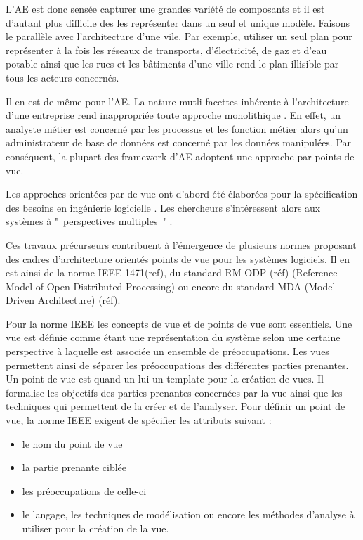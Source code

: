 L'AE est donc sensée capturer une grandes variété de composants et il est 
d'autant plus difficile des les représenter dans un seul et unique modèle. 
Faisons le parallèle avec l'architecture d'une vile. Par exemple, utiliser un 
seul plan pour représenter à la fois les réseaux de transports, d'électricité, 
de gaz et d'eau potable ainsi que les rues et les bâtiments d'une ville rend le 
plan illisible par tous les acteurs concernés.

Il en est de même pour l'AE. La nature mutli-facettes inhérente à l'architecture 
d'une entreprise rend inappropriée toute approche monolithique 
\cite{armour1999bigpicture}. En effet, un analyste métier est concerné par les 
processus et les fonction métier alors qu'un administrateur de base de données 
est concerné par les données manipulées. Par conséquent, la plupart des 
framework d'AE adoptent une approche par points de vue.

Les approches orientées par de vue ont d'abord été élaborées pour la 
spécification des besoins en ingénierie logicielle \cite{mullery1979core}. Les 
chercheurs s'intéressent alors aux systèmes à "~perspectives multiples~" 
\cite{finkelstein1992viewpoints} \cite{kotonya1996requirements} 
\cite{nuseibeh1994multi} \cite{meyers1993representing}. 

Ces travaux précurseurs contribuent à l'émergence de plusieurs normes proposant 
des cadres d'architecture orientés points de vue pour les systèmes logiciels. Il 
en est ainsi de la norme IEEE-1471(ref), du standard RM-ODP (réf) (Reference 
Model of Open Distributed Processing) ou encore du standard MDA (Model Driven 
Architecture) (réf).

Pour la norme IEEE les concepts de vue et de points de vue sont essentiels. 
Une vue est définie comme étant une représentation du système selon une certaine 
perspective à laquelle est associée un ensemble de préoccupations. Les vues 
permettent ainsi de séparer les préoccupations des différentes parties 
prenantes. Un point de vue est quand un lui un template pour la création de 
vues. Il formalise les objectifs des parties prenantes concernées par la vue 
ainsi que les techniques qui permettent de la créer et de l'analyser. Pour 
définir un point de vue, la norme IEEE exigent de spécifier les attributs 
suivant :
\begin{itemize}
\item le nom du point de vue
\item la partie prenante ciblée
\item les préoccupations de celle-ci
\item le langage, les techniques de modélisation ou encore les méthodes 
d'analyse à utiliser pour la création de la vue. 
\end{itemize}


